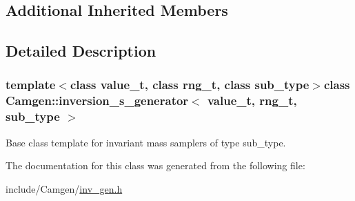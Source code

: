 \subsection*{Additional Inherited Members}


\subsection{Detailed Description}
\subsubsection*{template$<$class value\-\_\-t, class rng\-\_\-t, class sub\-\_\-type$>$class Camgen\-::inversion\-\_\-s\-\_\-generator$<$ value\-\_\-t, rng\-\_\-t, sub\-\_\-type $>$}

Base class template for invariant mass samplers of type sub\-\_\-type. 

The documentation for this class was generated from the following file\-:\begin{DoxyCompactItemize}
\item 
include/\-Camgen/\hyperlink{a00652}{inv\-\_\-gen.\-h}\end{DoxyCompactItemize}
